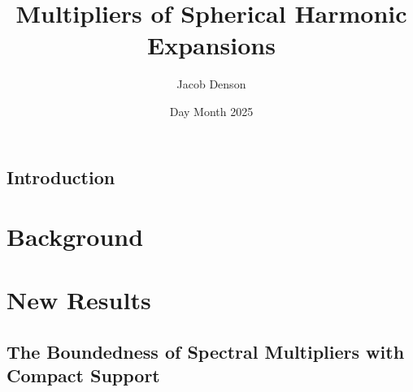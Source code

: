\documentclass[12pt]{report}
\title{Multipliers of Spherical Harmonic Expansions}
\author{Jacob Denson}
\date{Day Month 2025}
\theoremstyle{plain}
\theoremstyle{remark}
\numberwithin{equation}{section}
\begin{document}












\tableofcontents




\chapter*{Introduction}



\part{Background}


%

\part{New Results}
\chapter{The Boundedness of Spectral Multipliers with Compact Support} \label{chap:boundedsinglefrequencyscale}

\end{document}
